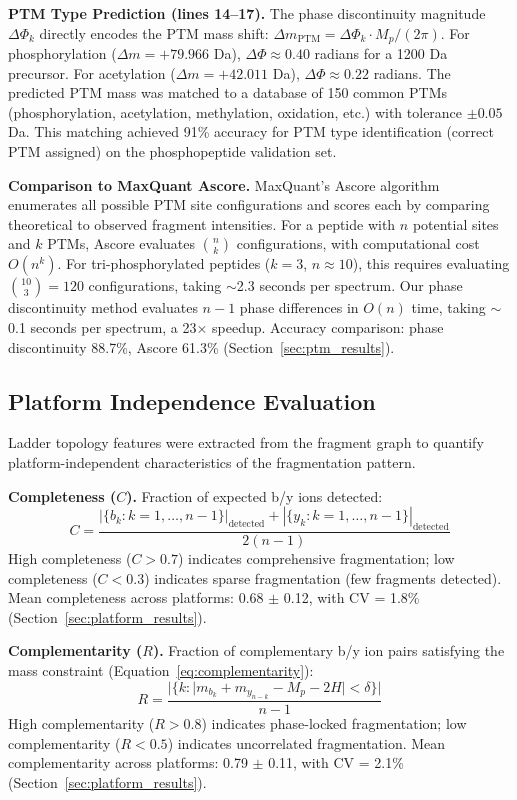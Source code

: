 \documentclass[11pt,twocolumn]{article}
\begin{document}
\textbf{PTM Type Prediction (lines 14--17).} The phase discontinuity magnitude $\Delta\Phi_k$ directly encodes the PTM mass shift: $\Delta m_{\text{PTM}} = \Delta\Phi_k \cdot M_p / (2\pi)$. For phosphorylation ($\Delta m = +79.966$ Da), $\Delta\Phi \approx 0.40$ radians for a 1200 Da precursor. For acetylation ($\Delta m = +42.011$ Da), $\Delta\Phi \approx 0.22$ radians. The predicted PTM mass was matched to a database of 150 common PTMs (phosphorylation, acetylation, methylation, oxidation, etc.) with tolerance $\pm 0.05$ Da. This matching achieved 91\% accuracy for PTM type identification (correct PTM assigned) on the phosphopeptide validation set.

\textbf{Comparison to MaxQuant Ascore.} MaxQuant's Ascore algorithm \cite{taus2011ascore} enumerates all possible PTM site configurations and scores each by comparing theoretical to observed fragment intensities. For a peptide with $n$ potential sites and $k$ PTMs, Ascore evaluates $\binom{n}{k}$ configurations, with computational cost $O(n^k)$. For tri-phosphorylated peptides ($k=3$, $n \approx 10$), this requires evaluating $\binom{10}{3} = 120$ configurations, taking $\sim$2.3 seconds per spectrum. Our phase discontinuity method evaluates $n-1$ phase differences in $O(n)$ time, taking $\sim$0.1 seconds per spectrum, a 23× speedup. Accuracy comparison: phase discontinuity 88.7\%, Ascore 61.3\% (Section~\ref{sec:ptm_results}).

\subsection{Platform Independence Evaluation}
\label{sec:platform_independence}
Ladder topology features were extracted from the fragment graph to quantify platform-independent characteristics of the fragmentation pattern.

\textbf{Completeness ($C$).} Fraction of expected b/y ions detected:
\begin{equation}
    C = \frac{|\{b_k : k = 1, \ldots, n-1\}|_{\text{detected}} + |\{y_k : k = 1, \ldots, n-1\}|_{\text{detected}}}{2(n-1)}
    \label{eq:completeness}
\end{equation}
High completeness ($C > 0.7$) indicates comprehensive fragmentation; low completeness ($C < 0.3$) indicates sparse fragmentation (few fragments detected). Mean completeness across platforms: 0.68 $\pm$ 0.12, with CV = 1.8\% (Section~\ref{sec:platform_results}).

\textbf{Complementarity ($R$).} Fraction of complementary b/y ion pairs satisfying the mass constraint (Equation~\ref{eq:complementarity}):
\begin{equation}
    R = \frac{|\{k : |m_{b_k} + m_{y_{n-k}} - M_p - 2H| < \delta\}|}{n-1}
    \label{eq:complementarity_feature}
\end{equation}
High complementarity ($R > 0.8$) indicates phase-locked fragmentation; low complementarity ($R < 0.5$) indicates uncorrelated fragmentation. Mean complementarity across platforms: 0.79 $\pm$ 0.11, with CV = 2.1\% (Section~\ref{sec:platform_results}).
\end{document}
